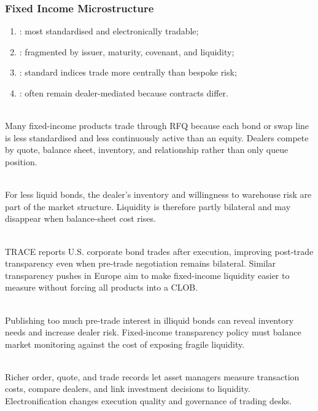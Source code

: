 \subsubsection{Fixed Income Microstructure}

\begin{taxonomy} 
\begin{enumerate}[label=\roman*.]
\setlength{\itemsep}{0pt}
\item {}: most standardised and electronically tradable;
\item {}: fragmented by issuer, maturity, covenant, and liquidity;
\item {}: standard indices trade more centrally than bespoke risk;
\item {}: often remain dealer-mediated because contracts differ.
\end{enumerate}
\end{taxonomy}

\begin{principle} \\
Many fixed-income products trade through RFQ because each bond or swap line is less standardised and less continuously active than an equity. Dealers compete by quote, balance sheet, inventory, and relationship rather than only queue position.
\end{principle}

\begin{mechanism} \\
For less liquid bonds, the dealer's inventory and willingness to warehouse risk are part of the market structure. Liquidity is therefore partly bilateral and may disappear when balance-sheet cost rises.
\end{mechanism}

\begin{marketrule} \\
TRACE reports U.S. corporate bond trades after execution, improving post-trade transparency even when pre-trade negotiation remains bilateral. Similar transparency pushes in Europe aim to make fixed-income liquidity easier to measure without forcing all products into a CLOB.
\end{marketrule}

\begin{caveat} \\
Publishing too much pre-trade interest in illiquid bonds can reveal inventory needs and increase dealer risk. Fixed-income transparency policy must balance market monitoring against the cost of exposing fragile liquidity.
\end{caveat}

\begin{practitionernote} \\
Richer order, quote, and trade records let asset managers measure transaction costs, compare dealers, and link investment decisions to liquidity. Electronification changes execution quality and governance of trading desks.
\end{practitionernote}
